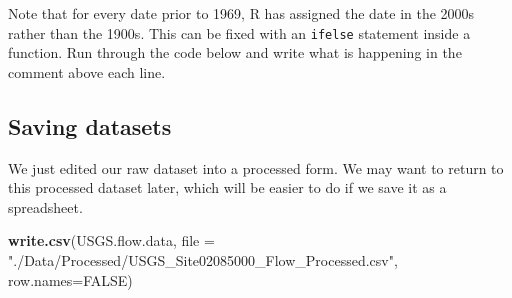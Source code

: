 \documentclass[]{article}
\newenvironment{Shaded}{\begin{snugshade}}{\end{snugshade}}
\newcommand{\CommentTok}[1]{\textcolor[rgb]{0.56,0.35,0.01}{\textit{#1}}}
\newcommand{\ControlFlowTok}[1]{\textcolor[rgb]{0.13,0.29,0.53}{\textbf{#1}}}
\newcommand{\DataTypeTok}[1]{\textcolor[rgb]{0.13,0.29,0.53}{#1}}
\newcommand{\DecValTok}[1]{\textcolor[rgb]{0.00,0.00,0.81}{#1}}
\newcommand{\KeywordTok}[1]{\textcolor[rgb]{0.13,0.29,0.53}{\textbf{#1}}}
\newcommand{\NormalTok}[1]{#1}
\newcommand{\OperatorTok}[1]{\textcolor[rgb]{0.81,0.36,0.00}{\textbf{#1}}}
\newcommand{\OtherTok}[1]{\textcolor[rgb]{0.56,0.35,0.01}{#1}}
\newcommand{\StringTok}[1]{\textcolor[rgb]{0.31,0.60,0.02}{#1}}
\begin{document}
Note that for every date prior to 1969, R has assigned the date in the
2000s rather than the 1900s. This can be fixed with an \texttt{ifelse}
statement inside a function. Run through the code below and write what
is happening in the comment above each line.

\begin{Shaded}
\end{Shaded}

\hypertarget{saving-datasets}{%
\subsection{Saving datasets}\label{saving-datasets}}

We just edited our raw dataset into a processed form. We may want to
return to this processed dataset later, which will be easier to do if we
save it as a spreadsheet.

\begin{Shaded}
\begin{Highlighting}[]
\KeywordTok{write.csv}\NormalTok{(USGS.flow.data, }\DataTypeTok{file =} \StringTok{"./Data/Processed/USGS_Site02085000_Flow_Processed.csv"}\NormalTok{, }\DataTypeTok{row.names=}\OtherTok{FALSE}\NormalTok{)}
\end{Highlighting}
\end{Shaded}
\end{document}
